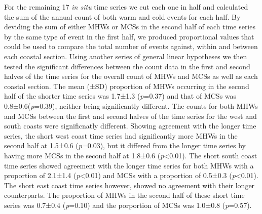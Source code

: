 \documentclass[a4paper,10pt,review]{elsarticle}
\begin{document}
For the remaining 17 \emph{in situ} time series we cut each one in half and calculated the sum of the annual count of both warm and cold events for each half. By deviding the sum of either MHWs or MCSs in the second half of each time series by the same type of event in the first half, we produced proportional values that could be used to compare the total number of events against, within and between each coastal section. Using another series of general linear hypotheses \citep{Hothorn2008} we then tested the significant differences between the count data in the first and second halves of the time series for the overall count of MHWs and MCSs as well as each coastal section. The mean (±SD) proportion of MHWs occurring in the second half of the shorter time series was 1.7±1.3 (\emph{p}=0.37) and that of MCSs was 0.8±0.6(\emph{p}=0.39), neither being significantly different. The counts for both MHWs and MCSs between the first and second halves of the time series for the west and south coasts were significnatly different. Showing agreement with the longer time series, the short west coast time series had significantly more MHWs in the second half at 1.5±0.6 (\emph{p}=0.03), but it differed from the longer time series by having more MCSs in the second half at 1.8±0.6 (\emph{p}<0.01). The short south coast time series showed agreement with the longer time series for both MHWs with a proportion of 2.1±1.4 (\emph{p}<0.01) and MCSs with a proportion of 0.5±0.3 (\emph{p}<0.01). The short east coast time series however, showed no agreement with their longer counterparts. The proportion of MHWs in the second half of these short time series was 0.7±0.4 (\emph{p}=0.10) and the porportion of MCSs was 1.0±0.8 (\emph{p}=0.57).
\end{document}
